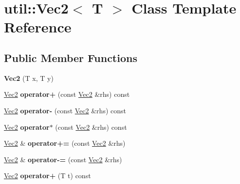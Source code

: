 \hypertarget{classutil_1_1_vec2}{}\section{util\+:\+:Vec2$<$ T $>$ Class Template Reference}
\label{classutil_1_1_vec2}
\subsection*{Public Member Functions}
\begin{DoxyCompactItemize}
\item 
\mbox{\label{classutil_1_1_vec2_a2f17c07895c746721d86f182a26fed50}} 
{\bfseries Vec2} (T x, T y)
\item 
\mbox{\label{classutil_1_1_vec2_a0a948cfbf9a1c29412cb1617a137c2ce}} 
\mbox{\hyperlink{classutil_1_1_vec2}{Vec2}} {\bfseries operator+} (const \mbox{\hyperlink{classutil_1_1_vec2}{Vec2}} \&rhs) const
\item 
\mbox{\label{classutil_1_1_vec2_aef35427cf18dff4309c91087b57ade7d}} 
\mbox{\hyperlink{classutil_1_1_vec2}{Vec2}} {\bfseries operator-\/} (const \mbox{\hyperlink{classutil_1_1_vec2}{Vec2}} \&rhs) const
\item 
\mbox{\label{classutil_1_1_vec2_a10c9a3f9884643c093c9f2bd04bc2fa6}} 
\mbox{\hyperlink{classutil_1_1_vec2}{Vec2}} {\bfseries operator$\ast$} (const \mbox{\hyperlink{classutil_1_1_vec2}{Vec2}} \&rhs) const
\item 
\mbox{\label{classutil_1_1_vec2_a594358b05ad70fdd7999c05a5e9b3388}} 
\mbox{\hyperlink{classutil_1_1_vec2}{Vec2}} \& {\bfseries operator+=} (const \mbox{\hyperlink{classutil_1_1_vec2}{Vec2}} \&rhs)
\item 
\mbox{\label{classutil_1_1_vec2_aae388980e9457f41378ad1abb7af97eb}} 
\mbox{\hyperlink{classutil_1_1_vec2}{Vec2}} \& {\bfseries operator-\/=} (const \mbox{\hyperlink{classutil_1_1_vec2}{Vec2}} \&rhs)
\item 
\mbox{\label{classutil_1_1_vec2_a15f9d17b02969a84089d213b6950352b}} 
\mbox{\hyperlink{classutil_1_1_vec2}{Vec2}} {\bfseries operator+} (T t) const

\end{DoxyCompactItemize}
